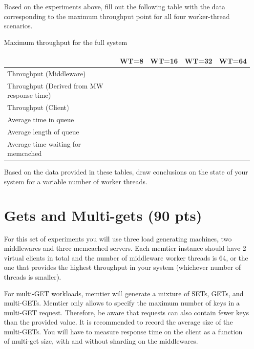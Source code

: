 \documentclass[11pt,a4paper]{article}
\begin{document}
Based on the experiments above, fill out the following table with the data corresponding to the maximum throughput point for all four worker-thread scenarios.

\begin{center}
	{Maximum throughput for the full system}
	\begin{tabular}{|l|p{1.5cm}|p{1.5cm}|p{1.5cm}|p{1.5cm}|}
		\hline                                            & WT=8 & WT=16 & WT=32 & WT=64 \\ 
		\hline Throughput (Middleware)                    &      &       &       &       \\ 
		\hline Throughput (Derived from MW response time) &      &       &       &       \\ 
		\hline Throughput (Client)                        &      &       &       &       \\ 
		\hline Average time in queue                      &      &       &       &       \\ 
		\hline Average length of queue                    &      &       &       &       \\ 
		\hline Average time waiting for memcached         &      &       &       &       \\ 
		\hline 
	\end{tabular}
\end{center}

Based on the data provided in these tables, draw conclusions on the state of your system for a variable number of worker threads.

\section{Gets and Multi-gets (90 pts)}

For this set of experiments you will use three load generating machines, two middlewares and three memcached servers. Each memtier instance should have 2 virtual clients in total and the number of middleware worker threads is 64, or the one that provides the highest throughput in your system (whichever number of threads is smaller).

For multi-GET workloads, memtier will generate a mixture of SETs, GETs, and multi-GETs. Memtier only allows to specify the maximum number of keys in a multi-GET request. Therefore, be aware that requests can also contain fewer keys than the provided value. It is recommended to record the average size of the multi-GETs. You will have to measure response time on the client as a function of multi-get size, with and without sharding on the middlewares.
\end{document}
